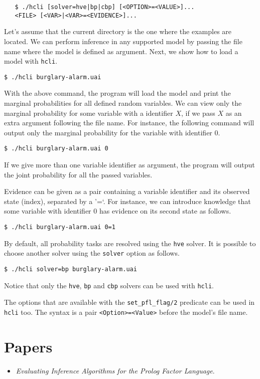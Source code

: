 \documentclass{article}
\begin{document}
\begin{verbatim}
   $ ./hcli [solver=hve|bp|cbp] [<OPTION>=<VALUE>]...
   <FILE> [<VAR>|<VAR>=<EVIDENCE>]...
\end{verbatim}

Let's assume that the current directory is the one where the examples are located. We can perform inference in any supported model by passing the file name where the model is defined as argument. Next, we show how to load a model with \texttt{hcli}.

\texttt{\$ ./hcli burglary-alarm.uai}

With the above command, the program will load the model and print the marginal probabilities for all defined random variables. We can view only the marginal probability for some variable with a identifier $X$, if we pass $X$ as an extra argument following the file name. For instance, the following command will output only the marginal probability for the variable with identifier $0$.

\texttt{\$ ./hcli burglary-alarm.uai 0}

If we give more than one variable identifier as argument, the program will output the joint probability for all the passed variables.

Evidence can be given as a pair containing a variable identifier and its observed state (index), separated by a '=`. For instance, we can introduce knowledge that some variable with identifier $0$ has evidence on its second state as follows.

\texttt{\$ ./hcli burglary-alarm.uai 0=1}

By default, all probability tasks are resolved using the \texttt{hve} solver. It is possible to choose another solver using the \texttt{solver} option as follows.

\texttt{\$ ./hcli solver=bp burglary-alarm.uai}

Notice that only the \texttt{hve}, \texttt{bp} and \texttt{cbp} solvers can be used with \texttt{hcli}.

The options that are available with the \texttt{set\_pfl\_flag/2} predicate can be used in \texttt{hcli} too. The syntax is a pair \texttt{<Option>=<Value>} before the model's file name.



\section{Papers}
\begin{itemize}
  \item \textit{Evaluating Inference Algorithms for the Prolog Factor Language}.
\end{itemize}
\end{document}

